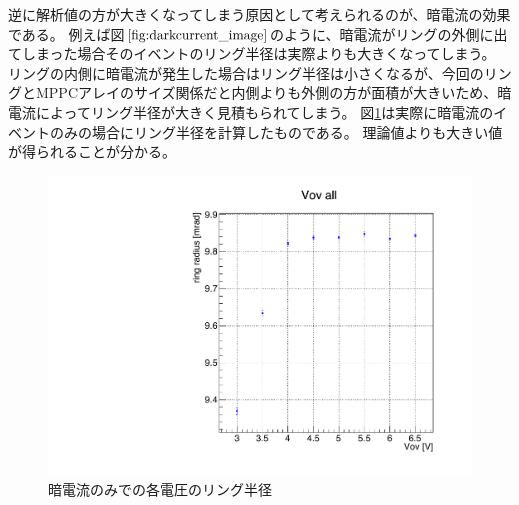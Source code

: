 \documentclass[uplatex, titlepage, dvipdfmx, 12pt, a4paper]{jsreport}
\begin{document}
      逆に解析値の方が大きくなってしまう原因として考えられるのが、暗電流の効果である。
      例えば図$\ref{fig:darkcurrent_image}$のように、暗電流がリングの外側に出てしまった場合そのイベントのリング半径は実際よりも大きくなってしまう。
      リングの内側に暗電流が発生した場合はリング半径は小さくなるが、今回のリングとMPPCアレイのサイズ関係だと内側よりも外側の方が面積が大きいため、暗電流によってリング半径が大きく見積もられてしまう。
      図\ref{fig:darkcurrent_radius}は実際に暗電流のイベントのみの場合にリング半径を計算したものである。
      理論値よりも大きい値が得られることが分かる。
      \begin{figure}[h]
        \begin{center} 
          \includegraphics[scale=0.4, clip]{image/background_radius.pdf}
          \caption{暗電流のみでの各電圧のリング半径}
          \label{fig:darkcurrent_radius} 
        \end{center}
      \end{figure}
\end{document}
